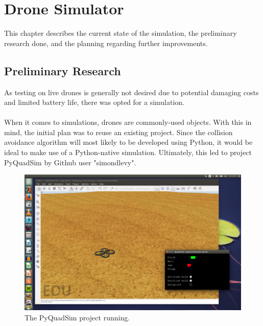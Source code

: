 \chapter{Drone Simulator}
\label{ch:simulator}

This chapter describes the current state of the simulation, the preliminary research done, and the planning regarding further improvements.

\section{Preliminary Research}
\label{sec:sim_research}
As testing on live drones is generally not desired due to potential damaging costs and limited battery life, there was opted for a simulation.\hfil
\\\\
When it comes to simulations, drones are commonly-used objects. With this in mind, the initial plan was to reuse an existing project. Since the collision avoidance algorithm will most likely to be developed using Python, it would be ideal to make use of a Python-native simulation. Ultimately, this led to project PyQuadSim by Github user "simondlevy". \cite{simon_github} \hfil
\begin{figure}[h]
	\centering
	\includegraphics[width=\linewidth]{img/pyquadsim.png}
	\caption{The PyQuadSim project running. \cite{pyquadsim}}
	\label{fig:pyquadsim}
\end{figure}

